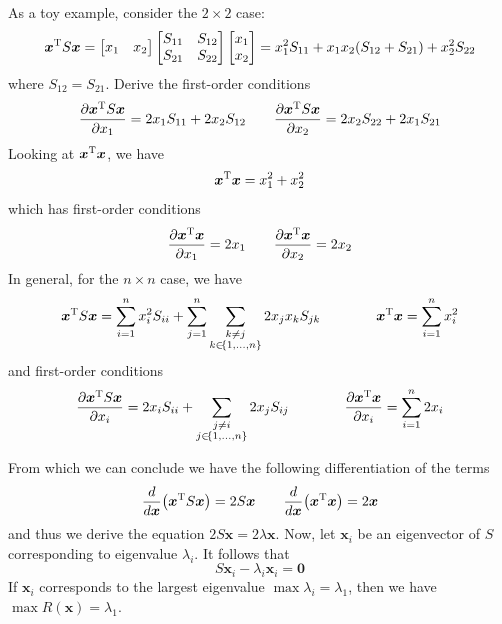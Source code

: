 \documentclass[a4paper]{article}
\begin{document}
As a toy example, consider the \(2 \times 2\) case:
\[
	\bm{x}^{\textsc{T}}S \bm{x} =
	\begin{bmatrix}
		x_{1} & x_{2} \\
	\end{bmatrix}
	\begin{bmatrix}
		S_{11} & S_{12} \\
		S_{21} & S_{22} \\
	\end{bmatrix}
	\begin{bmatrix}
		x_{1} \\
		x_{2} \\
	\end{bmatrix}
	=
	x_{1}^{2} S_{11} + x_{1}x_{2} \!\left( S_{12} + S_{21} \right) + x_{2}^{2} S_{22}
\]
where \(S_{12} = S_{21}\). Derive the first-order conditions
\[
	\frac{\partial \bm{x}^{\textsc{T}}S \bm{x}}{\partial x_{1}} = 2x_{1}S_{11} + 2x_{2}S_{12} \qquad \frac{\partial \bm{x}^{\textsc{T}}S \bm{x}}{\partial x_{2}} = 2x_{2}S_{22} + 2x_{1}S_{21} 
\]
Looking at \(\bm{x}^{\textsc{T}}\bm{x}\), we have
\[
	\bm{x}^{\textsc{T}}\bm{x} = x_{1}^{2} + x_{2}^{2}
\]
which has first-order conditions
\[
	\frac{\partial \bm{x}^{\textsc{T}}\bm{x}}{\partial x_{1}} = 2x_{1} \qquad \frac{\partial \bm{x}^{\textsc{T}}\bm{x}}{\partial x_{2}} = 2x_{2}
\]
In general, for the \(n \times n\) case, we have
\[
	\bm{x}^{\textsc{T}}S \bm{x} = \sum_{i=1}^{n} x_{i}^{2} S_{ii} + \sum_{j=1}^{n} \sum_{\substack{k \neq j \\ k \in \!\left\{ 1, \ldots, n \right\} }} 2 x_{j} x_{k} S_{jk} \qquad \qquad \bm{x}^{\textsc{T}}\bm{x} = \sum_{i=1}^{n} x_{i}^{2}
\]
and first-order conditions
\[
	\frac{\partial \bm{x}^{\textsc{T}}S\bm{x}}{\partial x_{i}}  = 2x_{i} S_{ii} + \sum_{\substack{j \neq i \\ j \in \!\left\{ 1, \ldots, n \right\} }} 2 x_{j} S_{ij} \qquad \qquad \frac{\partial \bm{x}^{\textsc{T}}\bm{x}}{\partial x_{i}}  = \sum_{i=1}^{n} 2x_{i}
\]

From which we can conclude we have the following differentiation of the terms
\[
	\frac{d }{d \bm{x}} \!\left( \bm{x}^{\textsc{T}}S \bm{x} \right) = 2 S \bm{x} \qquad \frac{d }{d \bm{x}} \!\left( \bm{x}^{\textsc{T}}\bm{x} \right) = 2 \bm{x}
\]
and thus we derive the equation \(2 S \bm{x} = 2 \lambda \bm{x}\). Now, let \(\bm{x}_{i}\) be an eigenvector of \(S\) corresponding to eigenvalue \(\lambda_{i}\). It follows that
\[
	S \bm{x}_{i} - \lambda_{i}\bm{x}_{i} = \bm{0}
\]
If \(\bm{x}_{i}\) corresponds to the largest eigenvalue \(\max \lambda_{i} = \lambda_{1}\), then we have \(\max R \!\left( \bm{x} \right) = \lambda_{1}\).
\end{document}
